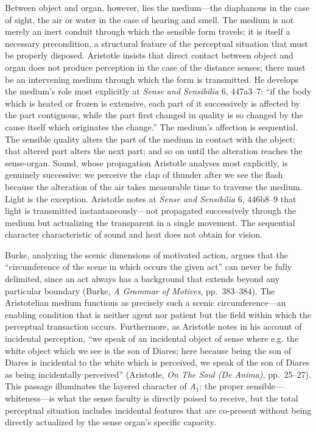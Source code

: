 \documentclass[12pt]{article}
\begin{document}
Between object and organ, however, lies the medium---the diaphanous in the case of sight, the air or water in the case of hearing and smell. The medium is not merely an inert conduit through which the sensible form travels; it is itself a necessary precondition, a structural feature of the perceptual situation that must be properly disposed. Aristotle insists that direct contact between object and organ does not produce perception in the case of the distance senses; there must be an intervening medium through which the form is transmitted. He develops the medium's role most explicitly at \textit{Sense and Sensibilia} 6, 447a3--7: ``if the body which is heated or frozen is extensive, each part of it successively is affected by the part contiguous, while the part first changed in quality is so changed by the cause itself which originates the change.'' The medium's affection is sequential. The sensible quality alters the part of the medium in contact with the object; that altered part alters the next part; and so on until the alteration reaches the sense-organ. Sound, whose propagation Aristotle analyses most explicitly, is genuinely successive: we perceive the clap of thunder after we see the flash because the alteration of the air takes measurable time to traverse the medium. Light is the exception. Aristotle notes at \textit{Sense and Sensibilia} 6, 446b8--9 that light is transmitted instantaneously---not propagated successively through the medium but actualizing the transparent in a single movement. The sequential character characteristic of sound and heat does not obtain for vision.

Burke, analyzing the scenic dimensions of motivated action, argues that the ``circumference of the scene in which occurs the given act'' can never be fully delimited, since an act always has a background that extends beyond any particular boundary (Burke, \textit{A Grammar of Motives}, pp.~383--384). The Aristotelian medium functions as precisely such a scenic circumference---an enabling condition that is neither agent nor patient but the field within which the perceptual transaction occurs. Furthermore, as Aristotle notes in his account of incidental perception, ``we speak of an incidental object of sense where e.g. the white object which we see is the son of Diares; here because being the son of Diares is incidental to the white which is perceived, we speak of the son of Diares as being incidentally perceived'' (Aristotle, \textit{On The Soul (De Anima)}, pp.~25--27). This passage illuminates the layered character of $A_1$: the proper sensible---whiteness---is what the sense faculty is directly poised to receive, but the total perceptual situation includes incidental features that are co-present without being directly actualized by the sense organ's specific capacity.
\end{document}
